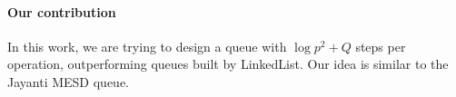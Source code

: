 \documentclass[12pt]{article}
\begin{document}



\paragraph{Our contribution}
In this work, we are trying to design a queue with $\log p^2 +Q$ steps per operation, outperforming queues built by LinkedList. Our idea is similar to the Jayanti MESD queue.

 

\end{document}
